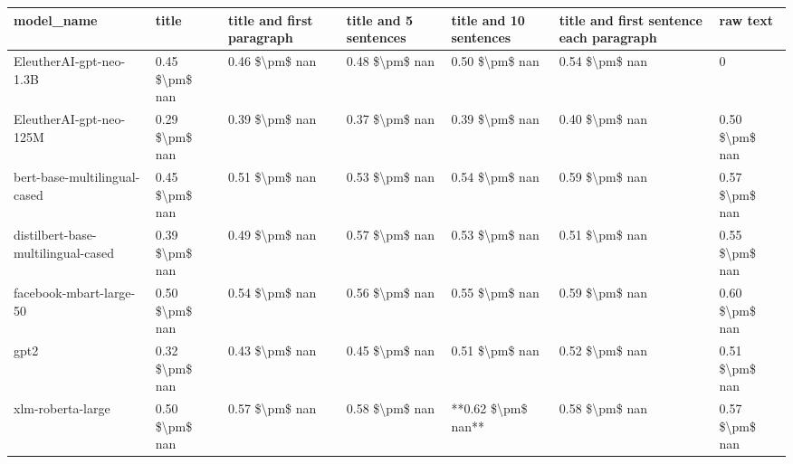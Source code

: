 \begin{tabular}{lllllll}
\toprule
                        model\_name &          title & title and first paragraph & title and 5 sentences & title and 10 sentences & title and first sentence each paragraph &       raw text \\
\midrule
           EleutherAI-gpt-neo-1.3B & 0.45 \$\textbackslash pm\$ nan &            0.46 \$\textbackslash pm\$ nan &        0.48 \$\textbackslash pm\$ nan &         0.50 \$\textbackslash pm\$ nan &                          0.54 \$\textbackslash pm\$ nan &              0 \\
           EleutherAI-gpt-neo-125M & 0.29 \$\textbackslash pm\$ nan &            0.39 \$\textbackslash pm\$ nan &        0.37 \$\textbackslash pm\$ nan &         0.39 \$\textbackslash pm\$ nan &                          0.40 \$\textbackslash pm\$ nan & 0.50 \$\textbackslash pm\$ nan \\
      bert-base-multilingual-cased & 0.45 \$\textbackslash pm\$ nan &            0.51 \$\textbackslash pm\$ nan &        0.53 \$\textbackslash pm\$ nan &         0.54 \$\textbackslash pm\$ nan &                          0.59 \$\textbackslash pm\$ nan & 0.57 \$\textbackslash pm\$ nan \\
distilbert-base-multilingual-cased & 0.39 \$\textbackslash pm\$ nan &            0.49 \$\textbackslash pm\$ nan &        0.57 \$\textbackslash pm\$ nan &         0.53 \$\textbackslash pm\$ nan &                          0.51 \$\textbackslash pm\$ nan & 0.55 \$\textbackslash pm\$ nan \\
           facebook-mbart-large-50 & 0.50 \$\textbackslash pm\$ nan &            0.54 \$\textbackslash pm\$ nan &        0.56 \$\textbackslash pm\$ nan &         0.55 \$\textbackslash pm\$ nan &                          0.59 \$\textbackslash pm\$ nan & 0.60 \$\textbackslash pm\$ nan \\
                              gpt2 & 0.32 \$\textbackslash pm\$ nan &            0.43 \$\textbackslash pm\$ nan &        0.45 \$\textbackslash pm\$ nan &         0.51 \$\textbackslash pm\$ nan &                          0.52 \$\textbackslash pm\$ nan & 0.51 \$\textbackslash pm\$ nan \\
                 xlm-roberta-large & 0.50 \$\textbackslash pm\$ nan &            0.57 \$\textbackslash pm\$ nan &        0.58 \$\textbackslash pm\$ nan &     **0.62 \$\textbackslash pm\$ nan** &                          0.58 \$\textbackslash pm\$ nan & 0.57 \$\textbackslash pm\$ nan \\
\bottomrule
\end{tabular}
